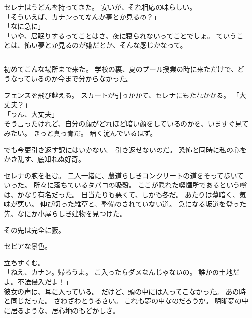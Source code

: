 \documentclass[../IHMain]{subfiles}
\begin{document}
セレナはうどんを持ってきた。
安いが、それ相応の味らしい。\\
「そういえば、カナンってなんか夢とか見るの？」\\
「なに急に」\\
「いや、居眠りするってことはさ、夜に寝られないってことでしょ。
ていうことは、怖い夢とか見るのが嫌だとか、そんな感じかなって。

\subsection*{}
初めてこんな場所まで来た。
学校の裏、夏のプール授業の時に来ただけで、どうなっているのか今まで分からなかった。

フェンスを飛び越える。
スカートが引っかかて、セレナにもたれかかる。
「大丈夫？」\\
「うん、大丈夫」\\
そう言ったけれど、自分の顔がどれほど暗い顔をしているのかを、いますぐ見てみたい。
きっと真っ青だ。
暗く淀んでいるはず。

でも今更引き返す訳にはいかない。
引き返せないのだ。
恐怖と同時に私の心をかき乱す、底知れぬ好奇。

セレナの腕を掴む。
二人一緒に、農道らしきコンクリートの道をそって歩いていった。
所々に落ちているタバコの吸殻。
ここが隠れた喫煙所であるという噂は、かなり有名だった。
日当たりも悪くて、しかも冬だ。
あたりは薄暗く、気味が悪い。
伸び切った雑草と、整備のされていない道。
急になる坂道を登った先、なにか小屋らしき建物を見つけた。

その先は完全に藪。

セピアな景色。

立ちすくむ。\\
「ねえ、カナン。帰ろうよ。
こ入ったらダメなんじゃないの。
誰かの土地だよ。不法侵入だよ！」\\
彼女の声は、耳に入っている。
だけど、頭の中には入ってこなかった。
あの時と同じだった。
ざわざわとうるさい。
これも夢の中なのだろうか。
明晰夢の中に居るような、居心地のもどかしさ。
\end{document}
